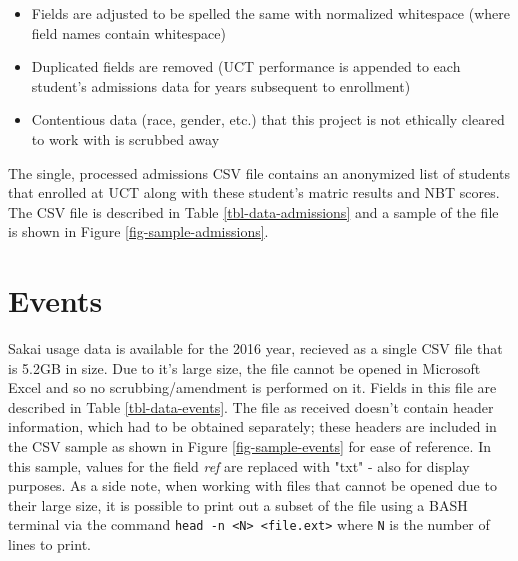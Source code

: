\begin{itemize}
    \item Fields are adjusted to be spelled the same with normalized whitespace (where field names contain whitespace)
    \item Duplicated fields are removed (UCT performance is appended to each student's admissions data for years subsequent to enrollment)
    \item Contentious data (race, gender, etc.) that this project is not ethically cleared to work with is scrubbed away
\end{itemize}

The single, processed admissions CSV file contains an anonymized list of students that enrolled at UCT along with these student's matric results and NBT scores. The CSV file is described in Table \ref{tbl-data-admissions} and a sample of the file is shown in Figure \ref{fig-sample-admissions}.




\section{Events}
Sakai usage data is available for the 2016 year, recieved as a single CSV file that is 5.2GB in size. Due to it's large size, the file cannot be opened in Microsoft Excel and so no scrubbing/amendment is performed on it. Fields in this file are described in Table \ref{tbl-data-events}. The file as received doesn't contain header information, which had to be obtained separately; these headers are included in the CSV sample as shown in Figure \ref{fig-sample-events} for ease of reference. In this sample, values for the field \textit{ref} are replaced with "txt" - also for display purposes. As a side note, when working with files that cannot be opened due to their large size, it is possible to print out a subset of the file using a BASH terminal via the command \texttt{head -n <N> <file.ext>} where \texttt{N} is the number of lines to print.


